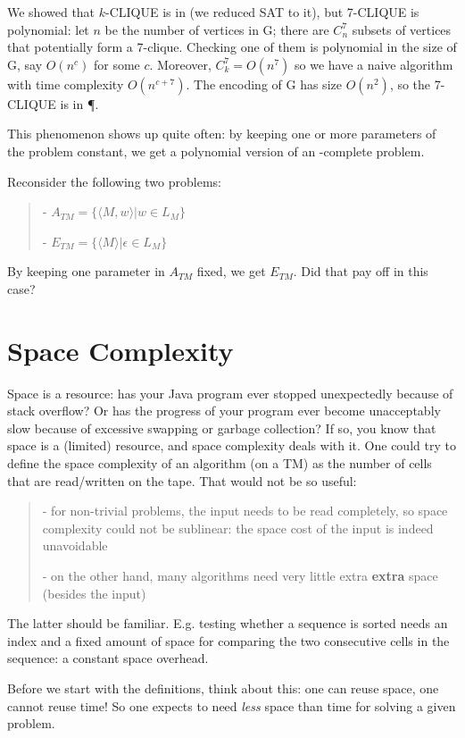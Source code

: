 {We showed that $k$-CLIQUE is in \NPC (we reduced SAT to it), but
7-CLIQUE is polynomial: let $n$ be the number of vertices in G; there
are $C_n^7$ subsets of vertices that potentially form a
7-clique. Checking one of them is polynomial in the size of G, say
$O(n^c)$ for some $c$. Moreover, $C_k^7 = O(n^7)$ so we have a naive
algorithm with time complexity $O(n^{c+7})$. The encoding of G has
size $O(n^2)$, so the 7-CLIQUE is in \P.

This phenomenon shows up quite often: by keeping one or more
parameters of the problem constant, we get a polynomial version of an
\NP-complete problem.

Reconsider the following two problems:

\begin{verse}
- $A_{TM} = \{\langle M,w \rangle| w \in L_M\}$

- $E_{TM} = \{\langle M \rangle| \epsilon \in L_M\}$
\end{verse}

By keeping one parameter in $A_{TM}$ fixed, we get $E_{TM}$. Did that
pay off in this case?



\section{Space Complexity}

Space is a resource: has your Java program ever stopped unexpectedly
because of stack overflow? Or has the progress of your program ever
become unacceptably slow because of excessive swapping or garbage
collection? If so, you know that space is a (limited) resource, and
space complexity deals with it. One could try to define the space
complexity of an algorithm (on a TM) as the number of cells that are
read/written on the tape. That would not be so useful:
\begin{verse}
- for non-trivial problems, the input needs to be read completely, so
space complexity could not be sublinear: the space cost of the input
is indeed unavoidable

- on the other hand, many algorithms need very little extra {\bf
extra} space (besides the input)
\end{verse}

The latter should be familiar. E.g. testing whether a sequence is
sorted needs an index and a fixed amount of space for comparing the
two consecutive cells in the sequence: a constant space overhead.

Before we start with the definitions, think about this: one can reuse
space, one cannot reuse time! So one expects to need {\em less} space
than time for solving a given problem.

}
